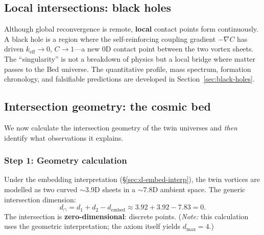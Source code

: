 \documentclass[12pt,a4paper]{article}
\newcommand{\bed}{Bed universe}
\begin{document}
\subsection{Local intersections: black holes}
\label{sec:local-intersection}

Although global reconvergence is remote, \textbf{local} contact points form continuously.  A black hole is a region where the self-reinforcing coupling gradient $-\nabla C$ has driven $k_{\mathrm{eff}} \to 0$, $C \to 1$---a new 0D contact point between the two vortex sheets.  The ``singularity'' is not a breakdown of physics but a local bridge where matter passes to the \bed{}.  The quantitative profile, mass spectrum, formation chronology, and falsifiable predictions are developed in Section~\ref{sec:black-holes}.

\subsection{Intersection geometry: the cosmic bed}
\label{sec:cosmic-web}

We now calculate the intersection geometry of the twin universes and \emph{then} identify what observations it explains.

\subsubsection{Step 1: Geometry calculation}

Under the embedding interpretation (\S\ref{sec:d-embed-interp}), the twin vortices are modelled as two curved $\sim$3.9D sheets in a $\sim$7.8D ambient space. The generic intersection dimension:
\begin{equation}
d_{\cap} = d_1 + d_2 - d_{\mathrm{embed}} \approx 3.92 + 3.92 - 7.83 = 0.
\end{equation}
The intersection is \textbf{zero-dimensional}: discrete points.  (\textit{Note:} this calculation uses the geometric interpretation; the axiom itself yields $d_{\max} = 4$.)
\end{document}
